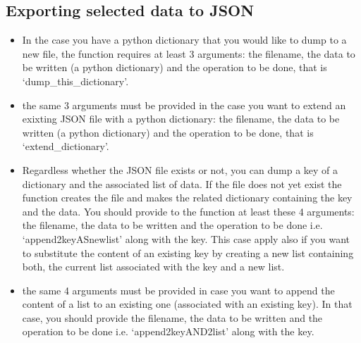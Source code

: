 \documentclass[letterpaper,10pt,english]{sphinxmanual}
\begin{document}
\subsection{Exporting selected data to JSON}
\label{\detokenize{Visualization:exporting-selected-data-to-json}}\begin{description}
\begin{itemize}
\item {} 
\sphinxAtStartPar
In the case you have a python dictionary that you would like to dump to a new file, the function  requires at least 3 arguments: the filename, the data to be written (a python dictionary) and the operation to be done, that is ‘dump\_this\_dictionary’.

\item {} 
\sphinxAtStartPar
the same 3 arguments must be provided in the case you want to extend an exixting JSON file with a python dictionary: the filename, the data to be written (a python dictionary) and the operation to be done, that is ‘extend\_dictionary’.

\item {} 
\sphinxAtStartPar
Regardless whether the JSON file exists or not, you can dump a key of a dictionary and the associated list of data. If the file does not yet exist the function creates the file and makes the related dictionary containing the key and the data. You should provide to the function at least these 4 arguments: the filename, the data to be written and the operation to be done \sphinxhyphen{} i.e. ‘append2keyASnewlist’ \sphinxhyphen{} along with the key. This case apply also if you want to substitute the content of an existing key by creating a new list containing both, the current list associated with the key and a new list.

\item {} 
\sphinxAtStartPar
the same 4 arguments must be provided in case you want to append the content of a list to an existing one (associated with an existing key). In that case, you should provide the filename, the data to be written and the operation to be done \sphinxhyphen{} i.e. ‘append2keyAND2list’ \sphinxhyphen{} along with the key.

\end{itemize}

\end{description}
\end{document}
